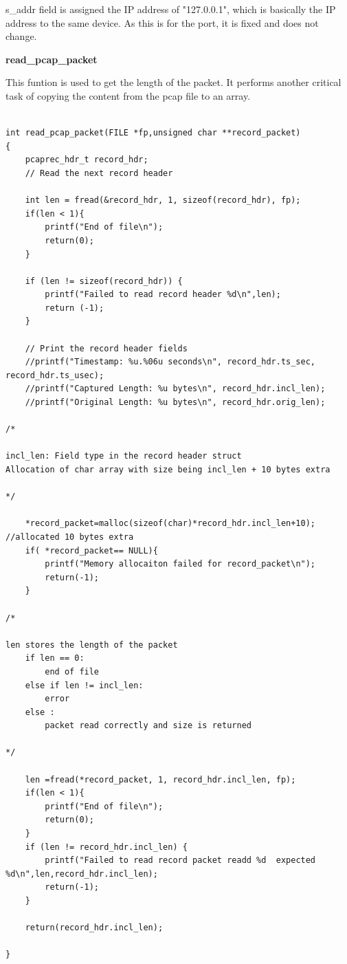 \documentclass[12pt, a4paper]{report}
\begin{document}
s\_addr field is assigned the IP address of "127.0.0.1", which is basically the IP address to the same device. As this is for the port, it is fixed and does not change.

\newpage

\textbf{read\_pcap\_packet}

This funtion is used to get the length of the packet. It performs another critical task of copying the content from the pcap file to an array.


\begin{lstlisting}[caption={Finding the length of the packet}]

int read_pcap_packet(FILE *fp,unsigned char **record_packet)
{
    pcaprec_hdr_t record_hdr;
    // Read the next record header

    int len = fread(&record_hdr, 1, sizeof(record_hdr), fp);
    if(len < 1){
        printf("End of file\n");
        return(0);
    } 
    
    if (len != sizeof(record_hdr)) {
        printf("Failed to read record header %d\n",len);
        return (-1);
    }

    // Print the record header fields
    //printf("Timestamp: %u.%06u seconds\n", record_hdr.ts_sec, record_hdr.ts_usec);
    //printf("Captured Length: %u bytes\n", record_hdr.incl_len);
    //printf("Original Length: %u bytes\n", record_hdr.orig_len);

/*

incl_len: Field type in the record header struct
Allocation of char array with size being incl_len + 10 bytes extra

*/

    *record_packet=malloc(sizeof(char)*record_hdr.incl_len+10); //allocated 10 bytes extra
    if( *record_packet== NULL){
        printf("Memory allocaiton failed for record_packet\n");
        return(-1);
    }

/*

len stores the length of the packet
    if len == 0:
        end of file
    else if len != incl_len:
        error
    else :
        packet read correctly and size is returned

*/
    
    len =fread(*record_packet, 1, record_hdr.incl_len, fp);
    if(len < 1){
        printf("End of file\n");
        return(0);
    }  
    if (len != record_hdr.incl_len) {
        printf("Failed to read record packet readd %d  expected %d\n",len,record_hdr.incl_len);
        return(-1);
    } 

    return(record_hdr.incl_len);

}

\end{lstlisting}
\end{document}
